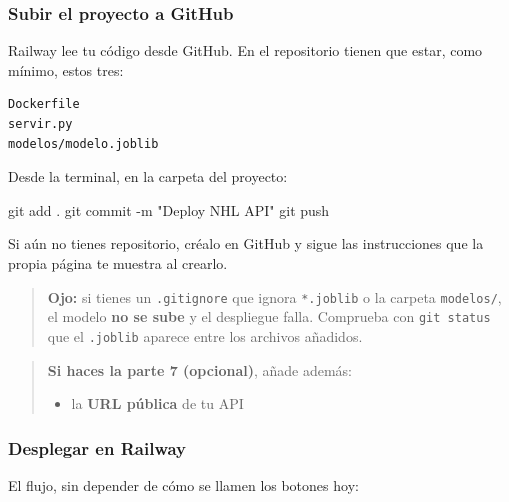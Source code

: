 \documentclass[
]{article}
\newenvironment{Shaded}{}{}
\newcommand{\AttributeTok}[1]{\textcolor[rgb]{0.49,0.56,0.16}{#1}}
\newcommand{\FunctionTok}[1]{\textcolor[rgb]{0.02,0.16,0.49}{#1}}
\newcommand{\NormalTok}[1]{#1}
\newcommand{\StringTok}[1]{\textcolor[rgb]{0.25,0.44,0.63}{#1}}
\providecommand{\tightlist}{%
  \setlength{\itemsep}{0pt}\setlength{\parskip}{0pt}}
\begin{document}
\protect{}\label{574ee7b8}
\subsubsection{Subir el proyecto a
GitHub}\label{subir-el-proyecto-a-github}

Railway lee tu código desde GitHub. En el repositorio tienen que estar,
como mínimo, estos tres:

\begin{verbatim}
Dockerfile
servir.py
modelos/modelo.joblib
\end{verbatim}

Desde la terminal, en la carpeta del proyecto:

\begin{Shaded}
\begin{Highlighting}[]
\FunctionTok{git}\NormalTok{ add .}
\FunctionTok{git}\NormalTok{ commit }\AttributeTok{{-}m} \StringTok{"Deploy NHL API"}
\FunctionTok{git}\NormalTok{ push}
\end{Highlighting}
\end{Shaded}

Si aún no tienes repositorio, créalo en GitHub y sigue las instrucciones
que la propia página te muestra al crearlo.

\begin{quote}
\textbf{Ojo:} si tienes un \texttt{.gitignore} que ignora
\texttt{*.joblib} o la carpeta \texttt{modelos/}, el modelo \textbf{no
se sube} y el despliegue falla. Comprueba con \texttt{git\ status} que
el \texttt{.joblib} aparece entre los archivos añadidos.
\end{quote}

\protect{}\label{f314cfa5}
\begin{quote}
\textbf{Si haces la parte 7 (opcional)}, añade además:

\begin{itemize}
\tightlist
\item
  la \textbf{URL pública} de tu API
\end{itemize}
\end{quote}

\subsubsection{Desplegar en Railway}\label{desplegar-en-railway}

El flujo, sin depender de cómo se llamen los botones hoy:
\end{document}
